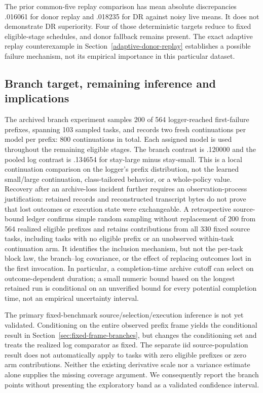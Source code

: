 The prior common-five replay comparison has mean absolute discrepancies .016061 for donor replay and .018235
for DR against noisy live means. It does not demonstrate DR superiority. Four of those deterministic targets
reduce to fixed eligible-stage schedules, and donor fallback remains present. The exact adaptive replay
counterexample in Section~\ref{adaptive-donor-replay} establishes a possible failure mechanism, not its empirical
importance in this particular dataset.

\subsection{Branch target, remaining inference and implications}
The archived branch experiment samples 200 of 564 logger-reached first-failure prefixes, spanning 103 sampled
tasks, and records two fresh continuations per model per prefix: 800 continuations in total. Each assigned model
is used throughout the remaining eligible stages. The branch contrast is .120000 and the pooled log contrast
is .134654 for stay-large minus stay-small. This is a local continuation comparison on the logger's prefix
distribution, not the learned small/large continuation, class-tailored behavior, or a whole-policy value.
Recovery after an archive-loss incident further requires an observation-process justification: retained records
and reconstructed transcript bytes do not prove that lost outcomes or execution state were exchangeable.
A retrospective source-bound ledger confirms simple random sampling without replacement of 200 from 564
realized eligible prefixes and retains contributions from all 330 fixed source tasks, including tasks with no
eligible prefix or an unobserved within-task continuation arm. It identifies the inclusion mechanism, but not
the per-task block law, the branch--log covariance, or the effect of replacing outcomes lost in the first
invocation. In particular, a completion-time archive cutoff can select on outcome-dependent duration; a
small numeric bound based on the longest retained run is conditional on an unverified bound for every
potential completion time, not an empirical uncertainty interval.

The primary fixed-benchmark source/selection/execution inference is not yet validated. Conditioning on the
entire observed prefix frame yields the conditional result in Section~\ref{sec:fixed-frame-branches}, but changes
the conditioning set and treats the realized log comparator as fixed. The separate iid source-population result
does not automatically apply to tasks with zero eligible prefixes or zero arm contributions. Neither the existing
derivative scale nor a variance estimate alone supplies the missing coverage argument. We consequently report
the branch points without presenting the exploratory band as a validated confidence interval.

